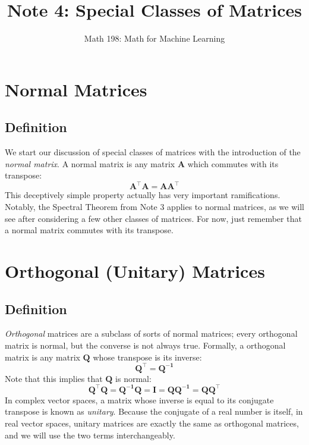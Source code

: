 \documentclass{article}
\title{Note 4: Special Classes of Matrices}
\author{Math 198: Math for Machine Learning}
\date{}
\begin{document}
\maketitle

\section{Normal Matrices}

\subsection{Definition}
We start our discussion of special classes of matrices with the introduction of the \textit{normal matrix}. A normal matrix is any matrix $\mathbf{A}$ which commutes with its transpose: $$\mathbf{A^{\top}A } = \mathbf{AA^{\top}}$$
This deceptively simple property actually has very important ramifications. Notably, the Spectral Theorem from Note 3 applies to normal matrices, as we will see after considering a few other classes of matrices. For now, just remember that a normal matrix commutes with its transpose.

\section{Orthogonal (Unitary) Matrices}

\subsection{Definition}
\textit{Orthogonal} matrices are a subclass of sorts of normal matrices; every orthogonal matrix is normal, but the converse is not always true. Formally, a orthogonal matrix is any matrix $\mathbf{Q}$ whose transpose is its inverse: $$\mathbf{Q^{\top}} = \mathbf{Q^{-1}}$$ Note that this implies that $\mathbf{Q}$ is normal: $$\mathbf{Q^{\top}Q} = \mathbf{Q^{-1}Q} = \mathbf{I} = \mathbf{QQ^{-1}} = \mathbf{QQ^{\top}}$$ In complex vector spaces, a matrix whose inverse is equal to its conjugate transpose is known as \textit{unitary}. Because the conjugate of a real number is itself, in real vector spaces, unitary matrices are exactly the same as orthogonal matrices, and we will use the two terms interchangeably.
\end{document}
